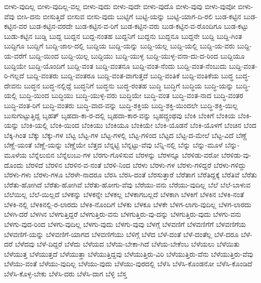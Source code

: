 {ಬೀಳು-ವುದಿಲ್ಲ
ಬೀಳು-ವುದಿಲ್ಲ-ವಲ್ಲ
ಬೀಳು-ವುದು
ಬೀಳು-ವುದೇ
ಬೀಳು-ವುದೊ
ಬೀಳು-ವುವು
ಬೀಳು-ವುವೋ
ಬೀಳು-ವೆವು
ಬೀಸಿ-ದನು
ಬೀಸುತ್ತಿದೆ
ಬೀಸುವ
ಬೀಸು-ವುದು
ಬುಟ್ಟಿಗೆ
ಬುಟ್ಟಿ-ಯನ್ನು
ಬುಟ್ಟಿ-ಯಾಗ-ದಿ-ರಲಿ
ಬುಡ-ಕಟ್ಟಿನ
ಬುಡ-ಕಟ್ಟಿನ-ವರ
ಬುಡ-ಕಟ್ಟಿನ-ವರದೇ
ಬುಡ-ಕಟ್ಟಿನ-ವ-ರಿಗೆ
ಬುಡ-ಕಟ್ಟಿನ-ವರು
ಬುಡ-ಕಟ್ಟಿನ-ವ-ರೊಂದಿಗೂ
ಬುಡ-ಕಟ್ಟು
ಬುಡು-ಕಟ್ಟಿನ
ಬುಡ್ಡಿ
ಬುದ್ದ
ಬುದ್ದನ
ಬುದ್ದ-ನಂತಹ
ಬುದ್ದನಿಗೆ
ಬುದ್ದನು
ಬುದ್ದನೂ
ಬುದ್ದನೇ
ಬುದ್ದಿ
ಬುದ್ದಿ-ಗಿಂತ
ಬುದ್ದಿಗೂ
ಬುದ್ದಿಗೆ
ಬುದ್ದಿ-ಜಾಲ-ದಲ್ಲಿ
ಬುದ್ದಿಯ
ಬುದ್ದಿ-ಯನ್ನು
ಬುದ್ದಿ-ಯಲ್ಲ
ಬುದ್ದಿ-ಯಲ್ಲಿ
ಬುದ್ದಿ-ಯ-ವರು
ಬುದ್ದಿ-ಯ-ವರೆಗೆ
ಬುದ್ದಿ-ಯಿಂದ
ಬುದ್ದಿ-ಯಿಲ್ಲ
ಬುದ್ದಿಯು
ಬುದ್ದಿ-ಯುಳ್ಳ
ಬುದ್ದಿ-ಯುಳ್ಳ-ವನಾ-ದು-ದ-ರಿಂದ
ಬುದ್ದಿಯೂ
ಬುದ್ದಿಯೇ
ಬುದ್ದಿ-ಯೊಂದಿಗೆ
ಬುದ್ದಿ-ವಂತ
ಬುದ್ದಿ-ವಂತನೂ
ಬುದ್ದಿ-ವಂತ-ನೆಂದು
ಬುದ್ದಿ-ವಂತ-ನೆಂಬುದು
ಬುದ್ದಿ-ವಂತ-ರಿ-ಗಲ್ಲದೆ
ಬುದ್ದಿ-ವಂತರು
ಬುದ್ದಿ-ವಂತರೂ
ಬುದ್ದಿ-ವಂತ-ವಾಗುತ್ತದೆ
ಬುದ್ದಿ-ವಂತಿಕೆ
ಬುದ್ದಿ-ವಂತಿಕೆಯ
ಬುದ್ಧ
ಬುದ್ಧ-ದೇವನು
ಬುದ್ಧನ
ಬುದ್ಧ-ನಲ್ಲಿದ್ದೆ
ಬುದ್ಧನಿಗೆ
ಬುದ್ಧನು
ಬುದ್ಧ-ರಂತಹ
ಬುದ್ಧಿ
ಬುದ್ಧಿಗೆ
ಬುದ್ಧಿಯ
ಬುದ್ಧಿ-ಯನ್ನು
ಬುದ್ಧಿ-ಯಲ್ಲಿ
ಬುದ್ಧಿ-ಯಿಂದ
ಬುದ್ಧಿಯು
ಬುದ್ಧಿ-ಯುಳ್ಳ-ವರು
ಬುದ್ಧಿಯೇ
ಬುದ್ಧಿ-ವಂತ
ಬುದ್ಧಿ-ವಂತ-ನಾದ
ಬುದ್ಧಿ-ವಂತರ
ಬುದ್ಧಿ-ವಂತ-ರಿಗೆ
ಬುದ್ಧಿ-ವಂತರು
ಬುದ್ಧಿ-ವಾದ-ವನ್ನು
ಬುದ್ಧಿ-ಶಕ್ತಿಯ
ಬುದ್ಧಿ-ಶಕ್ತಿ-ಯಿಂದಲೇ
ಬುದ್ಧಿ-ಶಕ್ತಿ-ಯಿಲ್ಲ
ಬುಸುಗುಟ್ಟುತ್ತಿದ್ದ
ಬೃಹತ್
ಬೃಹದಾ-ಕಾ-ರ-ದಲ್ಲಿ
ಬೃಹದಾ-ಕಾರ-ವನ್ನು
ಬೃಹದ್ಗ್ರಂಥವು
ಬೆಂಕಿ
ಬೆಂಕಿಗೆ
ಬೆಂಕಿಯ
ಬೆಂಕಿ-ಯನ್ನು
ಬೆಂಕಿ-ಯಲ್ಲಿ
ಬೆಂಕಿ-ಯಿಂದ
ಬೆಂಕಿಯು
ಬೆಂಕಿಯೂ
ಬೆಂಕಿಯೇ
ಬೆಂಕಿ-ಯೊಡನೆ
ಬೆಂಕಿ-ಯೊಳಗೆ
ಬೆಂಚಿನ
ಬೆಂದ
ಬೆಕ್ಕಿ-ಗಿಂತ
ಬೆಕ್ಕು
ಬೆಕ್ಕು-ಗಳ
ಬೆಟ್ಟ
ಬೆಟ್ಟ-ಗಳ
ಬೆಟ್ಟ-ಗಳಲ್ಲಿ
ಬೆಟ್ಟ-ಗಳಿಂದ
ಬೆಟ್ಟದ
ಬೆಟ್ಟ-ದ-ಮೇಲೆ
ಬೆಟ್ಟ-ವಿದೆ
ಬೆಣ್ಣೆ
ಬೆಣ್ಣೆ-ಯಂತೆ
ಬೆಣ್ಣೆ-ಯನ್ನು
ಬೆಣ್ಣೆಯೇ
ಬೆತ್ತದ
ಬೆನ್ನಟ್ಟಿ
ಬೆನ್ನಟ್ಟು-ವೆವು
ಬೆನ್ನಿ-ನಲ್ಲಿ
ಬೆನ್ನು
ಬೆನ್ನು-ಮೂಳೆ
ಬೆನ್ನು-ಮೂಳೆಯ
ಬೆನ್ನೆಲುಬಿನ
ಬೆನ್ನೆಲುಬು-ಗಳ
ಬೆರಗು-ಗೊಳಿಸುವ
ಬೆರಳನ್ನು
ಬೆರಳನ್ನೂ
ಬೆರಳಿಡು-ವರೋ
ಬೆರಳಿಡು-ವು-ದೊಂದು
ಬೆರಳಿದೆ
ಬೆರಳಿನ
ಬೆರಳಿನ-ವ-ನಂತೆ
ಬೆರಳಿ-ನಿಂದ
ಬೆರಳು
ಬೆರಳು-ಗಳ
ಬೆರಳು-ಗಳಿದ್ದರೆ
ಬೆರಳು-ಗಳಿದ್ದು
ಬೆರಳು-ಗಳು
ಬೆರಳು-ಗಳೂ
ಬೆರಳೇ-ನಾದರೂ
ಬೆರಸಿ
ಬೆರಸಿ-ದಂತೆ
ಬೆರಸುತ್ತಾರೆ
ಬೆರೆತಾಗ
ಬೆರೆತಿದ್ದಕ್ಕೆ
ಬೆರೆತಿವೆ
ಬೆರೆತು
ಬೆರೆತು-ಹೋಗಿದೆ
ಬೆರೆತು-ಹೋಗಿವೆ
ಬೆರೆತು-ಹೋಗು-ವೆವು
ಬೆರೆಯು-ವನು
ಬೆರೆಯು-ವುದಿಲ್ಲ
ಬೆಲೆ
ಬೆಲೆ-ಬಾಳುವ
ಬೆಲೆಯಿಲ್ಲ
ಬೆಲೆ-ಯಿಲ್ಲದೆ
ಬೆಳಕನ್ನು
ಬೆಳಕನ್ನೇ
ಬೆಳಕಲ್ಲ
ಬೆಳಕಾಗಬಲ್ಲದೆ
ಬೆಳಕಾಗಿ
ಬೆಳಕಿಗೆ
ಬೆಳಕಿನ
ಬೆಳಕಿ-ನಂತೆ
ಬೆಳಕಿ-ನಲ್ಲಿ
ಬೆಳಕಿನಲ್ಲಿ-ರ-ಲಾರದು
ಬೆಳಕಿ-ನೊಂದಿಗೆ
ಬೆಳಕು
ಬೆಳಕೂ
ಬೆಳಕೇ
ಬೆಳಗ-ಲಾಗು-ವುದಿಲ್ಲ
ಬೆಳಗ-ಲಾರದು
ಬೆಳಗಿ-ದರೆ
ಬೆಳಗಿನ
ಬೆಳಗುತ್ತಿದ್ದರೆ
ಬೆಳಗುತ್ತಿರು-ವನು
ಬೆಳಗುತ್ತಿರು-ವು-ದನ್ನು
ಬೆಳಗುತ್ತಿರು-ವುದು
ಬೆಳಗು-ವನು
ಬೆಳಗು-ವುದ-ರಿಂದ
ಬೆಳಗು-ವುದಿಲ್ಲ
ಬೆಳಗು-ವುದು
ಬೆಳಗು-ವುವು
ಬೆಳಗ್ಗೆ
ಬೆಳವಣಿಗೆ
ಬೆಳವಣಿಗೆಗೆ
ಬೆಳವಣಿಗೆಯ
ಬೆಳವಣಿಗೆ-ಯನ್ನು
ಬೆಳವಣಿಗೆ-ಯಾಗದ
ಬೆಳವಣಿಗೆಯು
ಬೆಳಿಗ್ಗೆ
ಬೆಳೆದ
ಬೆಳೆ-ದಂತೆ
ಬೆಳೆ-ದಂತೆಲ್ಲ
ಬೆಳೆ-ದರೂ
ಬೆಳೆ-ದರೆ
ಬೆಳೆದವು
ಬೆಳೆ-ದಿದ್ದರೆ
ಬೆಳೆದು
ಬೆಳೆಯದ
ಬೆಳೆಯ-ಬೇಕಾ-ಗಿದೆ
ಬೆಳೆಯ-ಬೇಕೆಂಬ
ಬೆಳೆಯಲು
ಬೆಳೆಯಿತು
ಬೆಳೆಯುತ್ತ
ಬೆಳೆಯುತ್ತದೆ
ಬೆಳೆಯುತ್ತಾ
ಬೆಳೆಯುತ್ತಿದ್ದವು
ಬೆಳೆಯುತ್ತಿರು-ವಿರಿ
ಬೆಳೆಯುತ್ತಿರು-ವೆನು
ಬೆಳೆಯುತ್ತಿರು-ವೆವು
ಬೆಳೆಯು-ವಂತೆ
ಬೆಳೆಯು-ವುದಿಲ್ಲ
ಬೆಳೆಯು-ವುದು
ಬೆಳೆಯು-ವುರದಲ್ಲಿ
ಬೆಳೆಸಿ
ಬೆಳೆಸಿ-ಕೊಂಡನೋ
ಬೆಳೆಸಿ-ಕೊಂಡಿದೆ
ಬೆಳೆಸಿ-ಕೊಳ್ಳ-ಬೇಕು
ಬೆಳೆಸಿ-ದರು
ಬೆಳೆಸಿ-ದಾಗ
ಬೆಳ್ಳಿ
ಬೆಸ್ತ
}
